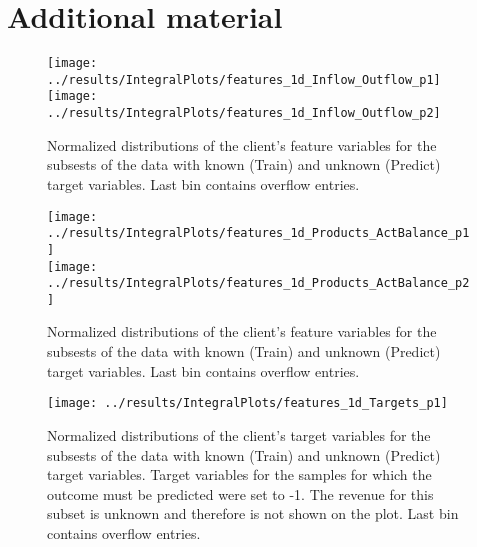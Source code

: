 \documentclass[14pt]{scrartcl}
\begin{document}
\clearpage
\appendix
\section{Additional material}\label{app:additional}
\begin{figure}[htpb!]
    \texttt{[image: ../results/IntegralPlots/features\_1d\_Inflow\_Outflow\_p1]}\\
    \texttt{[image: ../results/IntegralPlots/features\_1d\_Inflow\_Outflow\_p2]}
    \caption{Normalized distributions of the client's feature variables for the subsests of the
    data with known (Train) and unknown (Predict) target variables. Last bin contains
    overflow entries.}
    \label{fig:inclus_inflow_outflow}
\end{figure}
    \newpage
\begin{figure}[htpb!]
        \texttt{[image: ../results/IntegralPlots/features\_1d\_Products\_ActBalance\_p1]}\\
        \texttt{[image: ../results/IntegralPlots/features\_1d\_Products\_ActBalance\_p2]}
        \caption{Normalized distributions of the client's feature variables for the subsests of the
        data with known (Train) and unknown (Predict) target variables. Last bin contains
        overflow entries.}
        \label{fig:inclus_products_actbalance}
\end{figure}

\begin{figure}[htpb!]
    \texttt{[image: ../results/IntegralPlots/features\_1d\_Targets\_p1]}\\
    \caption{Normalized distributions of the client's target variables for the subsests of the
    data with known (Train) and unknown (Predict) target variables. Target variables for
    the samples for which the outcome must be predicted were set to -1. The revenue
    for this subset is unknown and therefore is not shown on the plot. Last bin contains
    overflow entries.}
    \label{fig:inclus_targets}
\end{figure}

\clearpage
\end{document}
